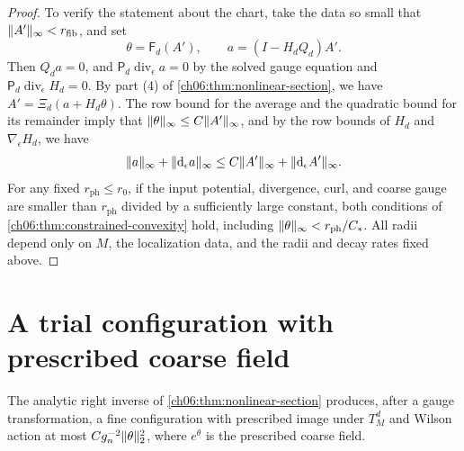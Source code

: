 \begin{proof}
To verify the statement about the chart, take the data so small that $\lVert A'\rVert_\infty<r_{\mathrm{fib}}$, and set
\[
 \theta=\mathsf F_d(A'),\qquad a=(I-H_dQ_d)A'.
\]
Then $Q_da=0$, and $\mathsf P_d\operatorname{div}_\epsilon a=0$ by the solved gauge equation and $\mathsf P_d\operatorname{div}_\epsilon H_d=0$. By part (4) of \cref{ch06:thm:nonlinear-section}, we have $A'=\Xi_d(a+H_d\theta)$. The row bound for the average and the quadratic bound for its remainder imply that $\lVert \theta\rVert_\infty\le C\lVert A'\rVert_\infty$, and by the row bounds of $H_d$ and $\nabla_\epsilon H_d$, we have
\[
 \lVert a\rVert_\infty+\lVert \mathrm d_\epsilon a\rVert_\infty\le C\lVert A'\rVert_\infty+\lVert \mathrm d_\epsilon A'\rVert_\infty.
\]
For any fixed $r_{\mathrm{ph}}\le r_0$, if the input potential, divergence, curl, and coarse gauge are smaller than $r_{\mathrm{ph}}$ divided by a sufficiently large constant, both conditions of \cref{ch06:thm:constrained-convexity} hold, including $\lVert \theta\rVert_\infty<r_{\mathrm{ph}}/C_*$. All radii depend only on $M$, the localization data, and the radii and decay rates fixed above.
\end{proof}

\section{A trial configuration with prescribed coarse field}\label{ch06:sec:trial}

The analytic right inverse of \cref{ch06:thm:nonlinear-section} produces, after a gauge transformation, a fine configuration with prescribed image under $T_M^d$ and Wilson action at most $Cg_n^{-2}\lVert \theta\rVert_2^2$, where $e^\theta$ is the prescribed coarse field.

